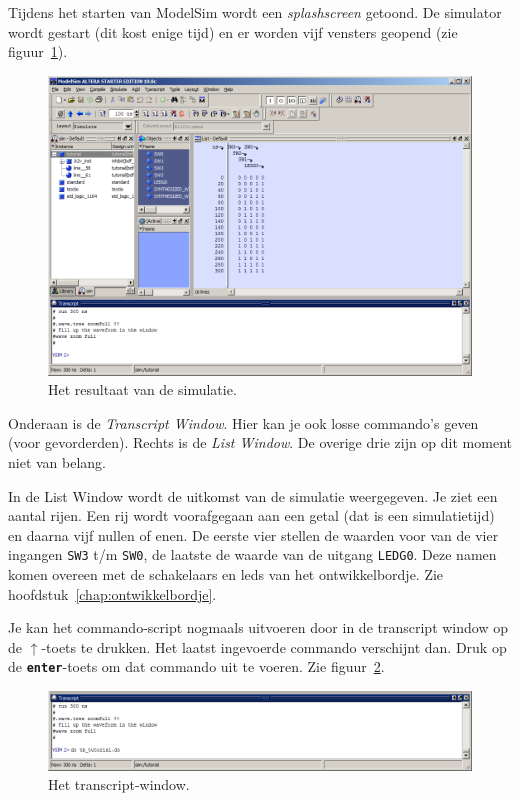 \documentclass[a4paper,12pt,fleqn,twoside]{book}
\def\tutpicscale{0.455}
\newcommand{\knop}[1]{\texttt{\textbf{#1}}}
\newcommand{\naam}[1]{\texttt{#1}}
\begin{document}
Tijdens het starten van ModelSim wordt een \textsl{splashscreen} getoond.
De simulator wordt gestart (dit kost enige tijd) en er worden vijf vensters
geopend (zie figuur~\ref{fig:044modelsimstarted}). 

\begin{figure}[H]
\centering
\includegraphics[scale=\tutpicscale]{044modelsimstarted}
\caption{Het resultaat van de simulatie.}
\label{fig:044modelsimstarted}
\end{figure}

Onderaan is de \textsl{Transcript Window}. Hier kan je ook losse commando's
geven (voor gevorderden). Rechts is de \textsl{List Window}. De overige drie
zijn op dit moment niet van belang. 
 
In de List Window wordt de uitkomst van de simulatie weergegeven. Je ziet een
aantal rijen. Een rij wordt voorafgegaan aan een getal (dat is een
simulatietijd) en daarna vijf nullen of enen. De eerste vier stellen de
waarden voor van de vier ingangen \naam{SW3} t/m \naam{SW0}, de laatste de
waarde van de uitgang \naam{LEDG0}. Deze namen komen overeen met de schakelaars
en leds van het ontwikkelbordje. Zie hoofdstuk~\ref{chap:ontwikkelbordje}.

Je kan het commando-script nogmaals uitvoeren door in de transcript window
op de $\uparrow$-toets te drukken. Het laatst ingevoerde commando verschijnt
dan. Druk op de \knop{enter}-toets om dat commando uit te voeren. Zie
figuur~\ref{fig:045transcriptwindow}.

\begin{figure}[H]
\centering
\includegraphics[scale=\tutpicscale]{045transcriptwindow}
\caption{Het transcript-window.}
\label{fig:045transcriptwindow}
\end{figure}
\end{document}
